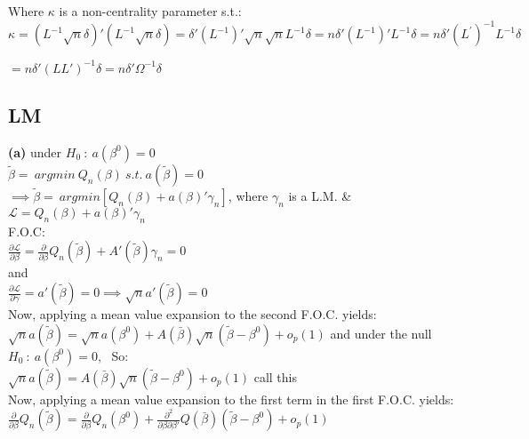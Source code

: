 \documentclass[11pt]{article}
\theoremstyle{definition}
\newcommand*\circled[1]{\tikz[baseline=(char.base)]{
            \node[shape=circle,draw,inner sep=2pt] (char) {#1};}}
\def\Ho{$H_{0} \ : \ a(\beta^{0})=0$}
\begin{document}
Where $\kappa$ is a non-centrality parameter s.t.: \\

$\kappa = \left(L^{-1}\sqrt{n}\delta\right)'\left(L^{-1}\sqrt{n}\delta\right)=\delta'\left(L^{-1}\right)'\sqrt{n}\sqrt{n}L^{-1}\delta=n\delta'\left(L^{-1}\right)'L^{-1}\delta=n\delta'\left(L^{'}\right)^{-1}L^{-1}\delta$

\hspace{3mm}$=n\delta'\left(LL'\right)^{-1}\delta=n\delta'\Omega^{-1}\delta$

\subsection{LM}
\textbf{(a)} under \Ho \\

$\tilde{\beta}= \ argmin \ Q_{n}(\beta) \ s.t. \ a(\tilde{\beta})=0$ \\

$\implies \tilde{\beta}= \ argmin \left[ Q_{n}(\beta) + a(\beta)'\gamma_{n}\right]$, where $\gamma_{n}$ is a L.M. \& $\mathcal{L}=Q_{n}(\beta) + a(\beta)'\gamma_{n}$\\

F.O.C: \\

$\frac{\partial \mathcal{L}}{\partial \beta}=\frac{\partial}{\partial \beta}Q_{n}(\tilde{\beta})+A'(\tilde{\beta})\gamma_{n}=0$ \\

and \\

$\frac{\partial \mathcal{L}}{\partial \gamma}= a'(\tilde{\beta})=0 \implies \sqrt{n}a'(\tilde{\beta})=0$ \\

Now, applying a mean value expansion to the second F.O.C. yields: \\

$\sqrt{n}a(\tilde{\beta})=\sqrt{n}a(\beta^{0})+A(\bar{\beta})\sqrt{n}(\tilde{\beta}-\beta^{0})+o_{p}(1)$ and under the null \Ho, \ So: \\

$\sqrt{n}a(\tilde{\beta})=A(\bar{\beta})\sqrt{n}(\tilde{\beta}-\beta^{0})+o_{p}(1)$ call this \circled{1} \\

Now, applying a mean value expansion to the first term in the first F.O.C. yields: \\

$\frac{\partial}{\partial \beta}Q_{n}(\tilde{\beta})=\frac{\partial}{\partial \beta}Q_{n}(\beta^{0})+ \frac{\partial^{2}}{\partial \beta \partial \beta'}Q(\bar{\beta})(\tilde{\beta}-\beta^{0}) +o_{p}(1)$ \\
\end{document}
